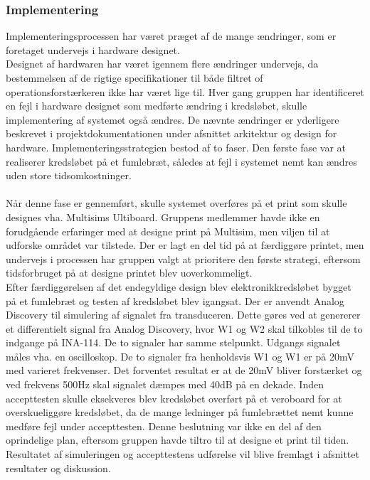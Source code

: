 \subsubsection{Implementering}
Implementeringsprocessen har været præget af de mange ændringer, som er foretaget undervejs i hardware designet. \\
Designet af hardwaren har været igennem flere ændringer undervejs, da bestemmelsen af de rigtige specifikationer til både filtret of operationsforstærkeren ikke har været lige til. Hver gang gruppen har identificeret en fejl i hardware designet som medførte ændring i kredsløbet, skulle implementering af systemet også ændres. De nævnte ændringer er yderligere beskrevet i projektdokumentationen under afsnittet arkitektur og design for hardware. Implementeringsstrategien bestod af to faser. Den første fase var at realiserer kredsløbet på et fumlebræt, således at fejl i systemet nemt kan ændres uden store tidsomkostninger. \\\\
Når denne fase er gennemført, skulle systemet overføres på et print som skulle designes vha. Multisims Ultiboard. Gruppens medlemmer havde ikke en forudgående erfaringer med at designe print på Multisim, men viljen til at udforske området var tilstede. Der er lagt en del tid på at færdiggøre printet, men undervejs i processen har gruppen valgt at prioritere den første strategi, eftersom tidsforbruget på at designe printet blev uoverkommeligt. \\
Efter færdiggørelsen af det endegyldige design blev elektronikkredsløbet bygget på et fumlebræt og testen af kredsløbet blev igangsat. Der er anvendt Analog Discovery til simulering af signalet fra transduceren. Dette gøres ved at genererer et differentielt signal fra Analog Discovery, hvor W1 og W2 skal tilkobles til de to indgange på INA-114. De to signaler har samme stelpunkt. Udgangs signalet måles vha. en oscilloskop. De to signaler fra henholdsvis W1 og W1 er på 20mV med varieret frekvenser. Det forventet resultat er at de 20mV bliver forstærket og ved frekvens 500Hz skal signalet dæmpes med 40dB på en dekade. Inden accepttesten skulle eksekveres blev kredsløbet overført på et veroboard for at overskueliggøre kredsløbet, da de mange ledninger på fumlebrættet nemt kunne medføre fejl under accepttesten. Denne beslutning var ikke en del af den oprindelige plan, eftersom gruppen havde tiltro til at designe et print til tiden. Resultatet af simuleringen og accepttestens udførelse vil blive fremlagt i afsnittet resultater og diskussion. 
